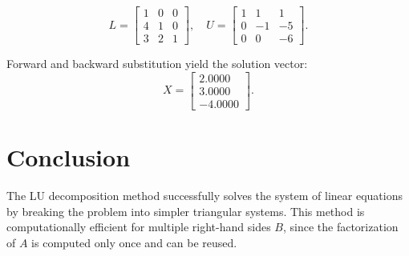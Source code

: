 \[
L = \begin{bmatrix}
1 & 0 & 0 \\
4 & 1 & 0 \\
3 & 2 & 1
\end{bmatrix}, \quad
U = \begin{bmatrix}
1 & 1 & 1 \\
0 & -1 & -5 \\
0 & 0 & -6
\end{bmatrix}.
\]

Forward and backward substitution yield the solution vector:
\[
X = \begin{bmatrix}
2.0000 \\
3.0000 \\
-4.0000
\end{bmatrix}.
\]

\section*{Conclusion}
The LU decomposition method successfully solves the system of linear equations by breaking the problem into simpler triangular systems. This method is computationally efficient for multiple right-hand sides $B$, since the factorization of $A$ is computed only once and can be reused.
